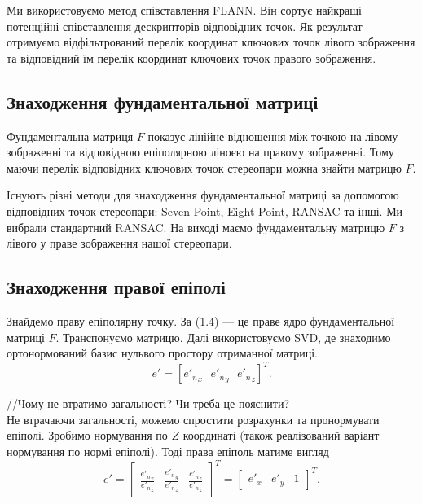Ми використовуємо метод співставлення FLANN\cite{Muja09fastapproximate}. Він 
сортує найкращі потенційні співставлення дескрипторів відповідних точок. Як
результат отримуємо відфільтрований перелік координат ключових точок лівого 
зображення та відповідний їм перелік координат ключових точок правого зображення.


\subsection{Знаходження фундаментальної матриці}
Фундаментальна матриця $F$ показує лінійне відношення між точкою на лівому 
зображенні та відповідною епіполярною ліноєю на правому зображенні. Тому маючи 
перелік відповідних ключових точок стереопари можна знайти матрицю $F$. 

Існують різні методи для знаходження фундаментальної матриці за допомогою 
відповідних точок стереопари: Seven-Point\cite{Hartley94projectivereconstruction},
Eight-Point\cite{LonguetHiggins1981ACA}, RANSAC\cite{10.1145/358669.358692} 
та інші. Ми вибрали стандартний RANSAC. На виході маємо фундаментальну матрицю
$F$ з лівого у праве зображення нашої стереопари.


\subsection{Знаходження правої епіполі}
Знайдемо праву епіполярну точку. За (1.4) --- це праве ядро фундаментальної 
матриці $F$. Транспонуємо матрицю. Далі використовуємо SVD\cite{1102314}, 
де знаходимо ортонормований базис нульвого простору отриманної матриці. 
\begin{equation}
e' = {[{{e'}_n}_x \:\:\: {{e'}_n}_y \:\:\: {{e'}_n}_z]}^T.
\end{equation}

//Чому не втратимо загальності? Чи треба це пояснити?\\
Не втрачаючи загальності, можемо спростити розрахунки та пронормувати епіполі.
Зробимо нормування по $Z$ координаті (також реалізований варіант нормування 
по нормі епіполі). Тоді права епіполь матиме вигляд
\begin{equation}
e' = {
\begin{bmatrix}
\frac{{{e'}_n}_x}{{{e'}_n}_z} & \frac{{{e'}_n}_y}{{{e'}_n}_z} & 
\frac{{{e'}_n}_z}{{{e'}_n}_z}
\end{bmatrix}
}^T = {
\begin{bmatrix}
e'_x & e'_y & 1
\end{bmatrix}
}^T.
\end{equation}

